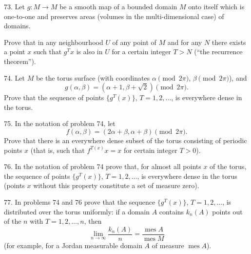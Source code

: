 \begin{problem}{73.}
	Let $g\colon M \to M$ be a smooth map of a bounded domain $M$ onto itself which
	is one-to-one and preserves areas (volumes in the multi-dimensional case) of domains.

	Prove that in any neighbourhood $U$ of any point of $M$ and for any $N$ there exists a point $x$
	such that $g^T x$ is also in $U$ for a certain integer $T>N$ (\enquote{the recurrence theorem}).
\end{problem}

\begin{problem}{74.}
	Let $M$ be the torus surface (with coordinates $\alpha \pmod{2\pi}$, $\beta \pmod{2\pi}$),
	and
	\begin{equation*}
		g(\alpha, \beta)=(\alpha+1, \beta+ \sqrt{2}) \pmod{2\pi}.
	\end{equation*}
	Prove that the sequence of points
	$\{g^T (x)\}$, $T=1, 2, \dotsc$, is everywhere dense in the torus.
\end{problem}

\begin{problem}{75.}
	In the notation of problem 74, let
	\begin{equation*}
		f(\alpha, \beta)=(2\alpha+\beta,\alpha+\beta) \pmod{2\pi}.
	\end{equation*}
	Prove that there is an everywhere dense subset of the torus consisting of periodic points $x$ (that is, such that
	$f^{T (x)} x=x$ for certain integer $T>0$).
\end{problem}

\begin{problem}{76.}
	In the notation of problem 74 prove that, for almost all points $x$ of the torus,
	the sequence of points $\{g^T (x)\}$, $T=1, 2, \dotsc$, is everywhere dense in the torus
	(points $x$ without this property constitute a set of measure zero).
\end{problem}

\begin{problem}{77.}
	In problems 74 and 76 prove that the sequence $\{g^T (x)\}$, $T=1, 2, \dotsc$, is distributed
	over the torus uniformly: if a domain $A$ contains $k_n(A)$ points out of the $n$ with $T=1, 2, \dotsc,n$, then
	\begin{equation*}
		\lim_{n \to \infty} \frac{k_n(A)}{n}=\frac{\operatorname{mes} A}{\operatorname{mes} M}
	\end{equation*}
	(for example, for a Jordan measurable domain $A$ of measure $\operatorname{mes} A$).
\end{problem}


